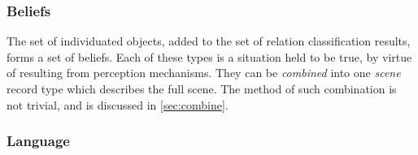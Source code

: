 \subsubsection{Beliefs}

The set of individuated objects, added to the set of relation classification results, forms a set of beliefs.
Each of these types is a situation held to be true, by virtue of resulting from perception mechanisms.
They can be \textit{combined} into one \textit{scene} record type which describes the full scene.
The method of such combination is not trivial, and is discussed in \autoref{sec:combine}.



\subsubsection{Language}
\label{sec:ttrlanguage}

%


